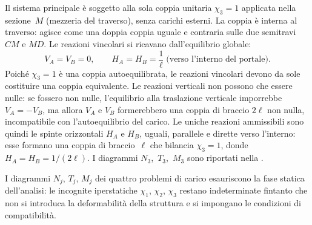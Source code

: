 \begin{esempio}
\begin{svolgimento}
		
		Il sistema principale è soggetto alla sola coppia
		unitaria $\chi_3 = 1$ applicata nella sezione~$M$
		(mezzeria del traverso), senza carichi esterni.
		La coppia è interna al traverso: agisce come una
		doppia coppia uguale e contraria sulle due semitravi
		$CM$ e $MD$.
		Le reazioni vincolari si ricavano dall'equilibrio
		globale:
		\[
		V_A = V_B = 0,
		\qquad
		H_A = H_B = \frac{1}{\ell} \;\text{(verso l'interno del portale)}.
		\]
		Poiché $\chi_3 = 1$ è una coppia autoequilibrata,
		le reazioni vincolari devono da sole costituire
		una coppia equivalente. Le reazioni verticali
		non possono che essere nulle: se fossero non nulle,
		l'equilibrio alla traslazione verticale imporrebbe
		$V_A = -V_B$, ma allora $V_A$ e $V_B$ formerebbero
		una coppia di braccio $2\ell$ non nulla, incompatibile
		con l'autoequilibrio del carico. Le uniche reazioni
		ammissibili sono quindi le spinte orizzontali $H_A$
		e $H_B$, uguali, parallele e dirette verso l'interno:
		esse formano una coppia di braccio~$\ell$ che bilancia
		$\chi_3 = 1$, donde $H_A = H_B = 1/(2\ell)$.
		I diagrammi $N_3$,~$T_3$,~$M_3$ sono riportati
		nella .
		



		
		I diagrammi $N_j$, $T_j$, $M_j$ dei quattro problemi di carico
		esauriscono la fase statica dell'analisi: le incognite
		iperstatiche $\chi_1$, $\chi_2$, $\chi_3$ restano indeterminate
		fintanto che non si introduca la deformabilità della struttura
		e si impongano le condizioni di compatibilità.
		
	\end{svolgimento}
\end{esempio}

